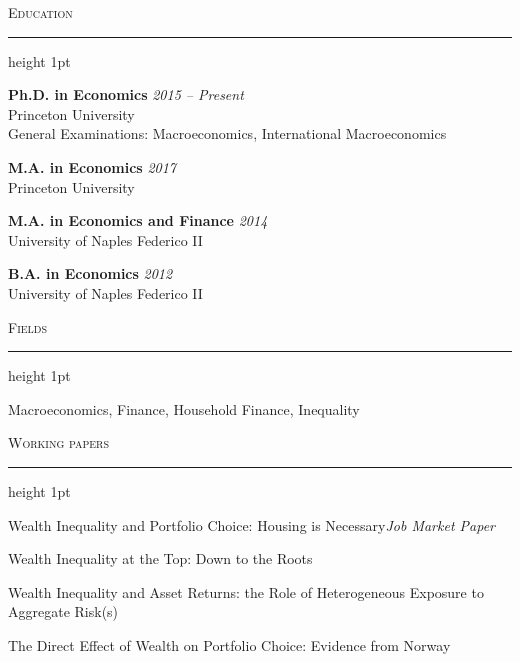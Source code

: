 \documentclass{resume} %
\renewenvironment{rSection}[1]{
\sectionskip
\Large{\textsc{#1}}
\normalsize
\sectionlineskip
\hrule height 1pt
\begin{list}{}{
\setlength{\leftmargin}{1.5em}
}
\item[]
}{
\end{list}
}
\begin{document}

\begin{rSection}{Education}


{\bf Ph.D. in Economics} \hfill {\em 2015 -- Present} 
\\ Princeton University \hfill
\\ General Examinations: Macroeconomics, International Macroeconomics \hfill

{\bf M.A. in Economics} \hfill {\em 2017} 
\\ Princeton University \hfill

{\bf M.A. in Economics and Finance} \hfill {\em 2014} 
\\ University of Naples Federico II \hfill

{\bf B.A. in Economics} \hfill {\em 2012} 
\\ University of Naples Federico II \hfill


\end{rSection}


\begin{rSection}{Fields}

Macroeconomics, Finance, Household Finance, Inequality

\end{rSection}


\begin{rSection}{Working papers}

{Wealth Inequality and Portfolio Choice: Housing is Necessary}\hfill {\em Job Market Paper}

{Wealth Inequality at the Top: Down to the Roots}\hfill {}



{Wealth Inequality and Asset Returns: the Role of Heterogeneous Exposure to Aggregate Risk(s)}\hfill {}

{The Direct Effect of Wealth on Portfolio Choice: Evidence from Norway}\hfill {}
\end{rSection}
\end{document}
